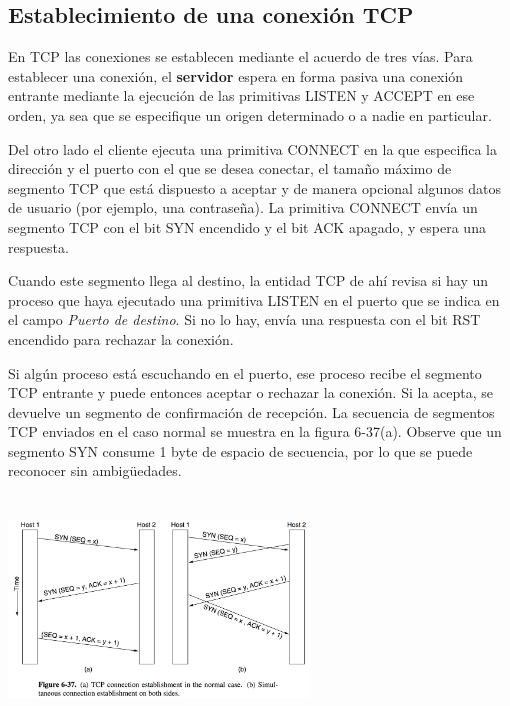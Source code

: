 \documentclass[10pt,a4paper]{report}
\begin{document}
\subsection{Establecimiento de una conexión TCP}

	\par En TCP las conexiones se establecen mediante el acuerdo de tres vías. Para establecer una conexión, el \textbf{servidor} espera en forma pasiva una conexión entrante mediante la ejecución de las primitivas LISTEN y ACCEPT en ese orden, ya sea que se especifique un origen determinado o a nadie en particular.

	\par Del otro lado el cliente ejecuta una primitiva CONNECT en la que especifica la dirección y el puerto con el que se desea conectar, el tamaño máximo de segmento TCP que está dispuesto a aceptar y de manera opcional algunos datos de usuario (por ejemplo, una contraseña). La primitiva CONNECT envía un segmento TCP con el bit SYN encendido y el bit ACK apagado, y espera una respuesta.

	\par Cuando este segmento llega al destino, la entidad TCP de ahí revisa si hay un proceso que haya ejecutado una primitiva LISTEN en el puerto que se indica en el campo \textit{Puerto de destino}. Si no lo hay, envía una respuesta con el bit RST encendido para rechazar la conexión.

	\par Si algún proceso está escuchando en el puerto, ese proceso recibe el segmento TCP entrante y puede entonces aceptar o rechazar la conexión. Si la acepta, se devuelve un segmento de confirmación de recepción. La secuencia de segmentos TCP enviados en el caso normal se muestra en la figura 6-37(a). Observe que un segmento SYN consume 1 byte de espacio de secuencia, por lo que se puede reconocer sin ambigüedades.

	\begin{center}
		\includegraphics[width=8cm, height=6cm]{./imagenes/conexiontcp.png}
	\end{center}
\end{document}
